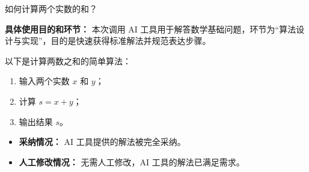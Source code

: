 \begin{block}[colback=orange!10, colframe=orange!60, title={\textcolor{black}{用户提问}}]
如何计算两个实数的和？
\vspace{0.5em}
\begin{flushright}
    \scriptsize
    \begin{flushleft}
        \textbf{具体使用目的和环节：} 本次调用 AI 工具用于解答数学基础问题，环节为“算法设计与实现”，目的是快速获得标准解法并规范表达步骤。
    \end{flushleft}
\end{flushright}
\end{block}


\begin{GPTblock}
以下是计算两数之和的简单算法：
\begin{enumerate}
    \item 输入两个实数 $x$ 和 $y$；
    \item 计算 $s = x + y$；
    \item 输出结果 $s$。
\end{enumerate}
\end{GPTblock}

\begin{block}[colback=green!10, colframe=green!50, title={\textcolor{black}{采纳和人工修改情况}}]
\begin{itemize}
    \item \textbf{采纳情况：} AI 工具提供的解法被完全采纳。
    \item \textbf{人工修改情况：} 无需人工修改，AI 工具的解法已满足需求。
\end{itemize}
\end{block}
